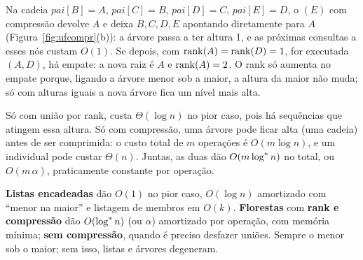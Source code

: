 \begin{exemplo}
Na cadeia $pai[B]=A$, $pai[C]=B$, $pai[D]=C$, $pai[E]=D$, o \Find$(E)$ com compressão devolve $A$ e deixa $B,C,D,E$ apontando diretamente para $A$ (Figura~\ref{fig:ufcompr}(b)): a árvore passa a ter altura 1, e as próximas consultas a esses nós custam $O(1)$. Se depois, com $\operatorname{rank}(A)=\operatorname{rank}(D)=1$, for executada \Union$(A,D)$, há empate: a nova raiz é $A$ e $\operatorname{rank}(A)=2$. O rank só aumenta no empate porque, ligando a árvore menor sob a maior, a altura da maior não muda; só com alturas iguais a nova árvore fica um nível mais alta.
\end{exemplo}
\begin{exemplo}
Só com união por rank, \Find{} custa $\Theta(\log n)$ no pior caso, pois há sequências que atingem essa altura. Só com compressão, uma árvore pode ficar alta (uma cadeia) antes de ser comprimida: o custo total de $m$ operações é $O(m\log n)$, e um \Find{} individual pode custar $\Theta(n)$. Juntas, as duas dão $O(m\log^{*} n)$ no total, ou $O(m\,\alpha)$, praticamente constante por operação.
\end{exemplo}

\begin{chave}
\textbf{Listas encadeadas} dão \Find{} $O(1)$ no pior caso, \Union{} $O(\log n)$ amortizado com ``menor na maior'' e listagem de membros em $O(k)$. \textbf{Florestas} com \textbf{rank e compressão} dão $O(\log^{*} n)$ (ou $\alpha$) amortizado por operação, com memória mínima; \textbf{sem compressão}, quando é preciso desfazer uniões. Sempre o menor sob o maior; sem isso, listas e árvores degeneram.
\end{chave}

